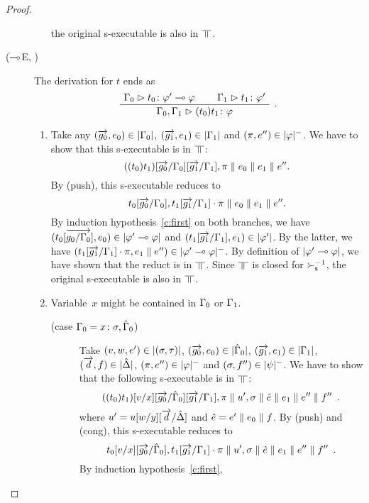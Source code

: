 \begin{proof}
\begin{description}
\begin{enumerate}[label=\textit{(\arabic{*})}]
	       the original s-executable is also in $\bbot$.
	\end{enumerate}
   \item[($\multimap$E, \textminus)]
	The derivation for $t$ ends as
	\[
	\aseq{\G_0}{\tj{t_0}{\phi'\limp\phi}}
	\aseq{\G_1}{\tj{t_1}{\phi'}}
	\bseq{\G_0,\G_1}{\tj{(t_0)t_1}{\phi}}
	\DisplayProof\enspace.
	\]
	\begin{enumerate}[label=\textit{(\arabic{*})}]
	 \item Take any
	       $(\overrightarrow{g_0},{e_0})\in|{\Gamma_0}|$,
	       $(\overrightarrow{g_1},{e_1})\in|{\Gamma_1}|$ and
	       $(\pi,e'')\in|{\varphi}|^-$.
	       We have to show that this s-executable is in $\bbot$:
	       \[
		((t_0)t_1)[\overrightarrow{g_0}/\Gamma_0][\overrightarrow{g_1}/\Gamma_1],\pi\parallel
	       {e_0}\parallel {e_1}\parallel e''.
	       \]
	       By (push), this s-executable reduces to
	       \[
		t_0[\overrightarrow{g_0}/\Gamma_0], t_1[\overrightarrow{g_1}/\Gamma_1]\cdot \pi
	       \parallel {e_0}\parallel {e_1}\parallel e''.
	       \]
	       By induction hypothesis~\ref{c:first} on both branches,
	       we have $(t_0[\overrightarrow{g_0/\Gamma_0}],
	       {e_0})\in|{\varphi'\multimap\varphi}|$
	       and
	       $(t_1[\overrightarrow{g_1}/\Gamma_1],{e_1})\in|{\varphi'}|$.
	       By the latter, we have $(t_1[\overrightarrow{g_1}/\Gamma_1]\cdot\pi,
	       {e_1}\parallel e'')\in|{\varphi'\multimap\varphi}|^-$.
	       By definition of $|{\varphi'\multimap\varphi}|$, we have shown that the
	       reduct is in $\bbot$.
	       Since $\bbot$ is closed for $\succ_{\mathsf s}^{-1}$,
	       the original s-executable is also in $\bbot$.
	 \item Variable~$x$ might be contained in $\Gamma_0$ or $\Gamma_1$.
	       \begin{description}
		\item[(case $\Gamma_0 = {x} \colon{\sigma},\hat{\Gamma}_0$)]
		     Take
		     $(v,w,e')\in|{(\sigma,\tau)}|$,
		     $(\overrightarrow{g_0},{e_0})\in|{\hat{\Gamma}_0}|$,
		     $(\overrightarrow{g_1},{e_1})\in|{\Gamma_1}|$,
		     $(\overrightarrow{d},{f})\in|{\hat{\Delta}}|$,
		     $(\pi,e'')\in|{\varphi}|^-$ and
		     $(\sigma,f'')\in|{\psi}|^-$.
		     We have to show that the following s-executable is in
		     $\bbot$:
		     \[
		     ((t_0)t_1)[v/x][\overrightarrow{g_0}/\hat{\Gamma}_0][\overrightarrow{g_1}/\Gamma_1],\pi\parallel
		     u' ,\sigma\parallel \hat e\parallel {{e_1}}\parallel
		     {e''}\parallel{f''}\enspace.
		     \]
		     where
		     $u' = u[w/y][\overrightarrow{d}/\hat{\Delta}]$ and
		     $\hat e= e'\parallel {e_0}\parallel {f}$.
		     By (push) and (cong), this s-executable reduces to
		     \[
		     t_0[v/x][\overrightarrow{g_0}/\hat{\Gamma}_0],
		     t_1[\overrightarrow{g_1}/\Gamma_1]\cdot\pi
		     \parallel
		     u' ,\sigma\parallel \hat e\parallel {{e_1}}\parallel
		     {e''}\parallel{f''}\enspace.
		     \]
		     By induction hypothesis~\ref{c:first},

\end{description}
\end{enumerate}
\end{description}
\end{proof}
